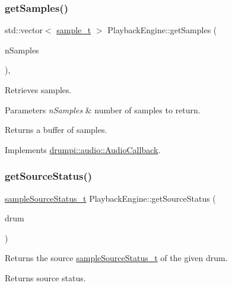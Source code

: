 \subsubsection{\texorpdfstring{get\+Samples()}{getSamples()}}
{\footnotesize\ttfamily std\+::vector$<$ \hyperlink{namespacedrumpi_1_1audio_aca0bdc9164f87b72057e284442abab6e}{sample\+\_\+t} $>$ Playback\+Engine\+::get\+Samples (\begin{DoxyParamCaption}\item[{int}]{n\+Samples }\end{DoxyParamCaption})\hspace{0.3cm}{\ttfamily [override]}, {\ttfamily [virtual]}}

Retrieves samples. 
\begin{DoxyParams}{Parameters}
{\em n\+Samples} & number of samples to return. \\
\hline
\end{DoxyParams}
\begin{DoxyReturn}{Returns}
a buffer of samples. 
\end{DoxyReturn}


Implements \hyperlink{classdrumpi_1_1audio_1_1AudioCallback_a9f53a830e6fd3d8eecf6f6ebb27314cd}{drumpi\+::audio\+::\+Audio\+Callback}.

\mbox{\label{classdrumpi_1_1audio_1_1PlaybackEngine_a2b2ce5172ee4c9b9cdf118b4c0972475}} 
\subsubsection{\texorpdfstring{get\+Source\+Status()}{getSourceStatus()}}
{\footnotesize\ttfamily \hyperlink{namespacedrumpi_1_1audio_a51bdf5757f414341f104d45e75e2bf63}{sample\+Source\+Status\+\_\+t} Playback\+Engine\+::get\+Source\+Status (\begin{DoxyParamCaption}\item[{\hyperlink{namespacedrumpi_a3897274035c1b939a604438abe648b1b}{drum\+I\+D\+\_\+t}}]{drum }\end{DoxyParamCaption})}

Returns the source \hyperlink{namespacedrumpi_1_1audio_a51bdf5757f414341f104d45e75e2bf63}{sample\+Source\+Status\+\_\+t} of the given drum. \begin{DoxyReturn}{Returns}
source status. 
\end{DoxyReturn}
\mbox{\label{classdrumpi_1_1audio_1_1PlaybackEngine_ab0c7e17c0a878563d98dcb316b9bf20f}} 
